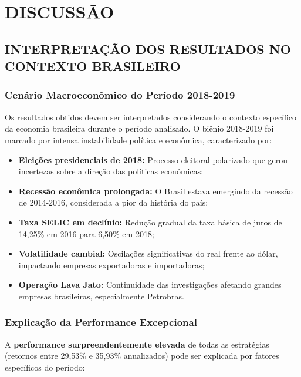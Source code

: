 
\chapter{DISCUSSÃO}

\section{INTERPRETAÇÃO DOS RESULTADOS NO CONTEXTO BRASILEIRO}

\subsection{Cenário Macroeconômico do Período 2018-2019}

Os resultados obtidos devem ser interpretados considerando o contexto específico da economia brasileira durante o período analisado. O biênio 2018-2019 foi marcado por intensa instabilidade política e econômica, caracterizado por:

\begin{itemize}
    \item \textbf{Eleições presidenciais de 2018:} Processo eleitoral polarizado que gerou incertezas sobre a direção das políticas econômicas;
    \item \textbf{Recessão econômica prolongada:} O Brasil estava emergindo da recessão de 2014-2016, considerada a pior da história do país;
    \item \textbf{Taxa SELIC em declínio:} Redução gradual da taxa básica de juros de 14,25\% em 2016 para 6,50\% em 2018;
    \item \textbf{Volatilidade cambial:} Oscilações significativas do real frente ao dólar, impactando empresas exportadoras e importadoras;
    \item \textbf{Operação Lava Jato:} Continuidade das investigações afetando grandes empresas brasileiras, especialmente Petrobras.
\end{itemize}

\subsection{Explicação da Performance Excepcional}

A \textbf{performance surpreendentemente elevada} de todas as estratégias (retornos entre 29,53\% e 35,93\% anualizados) pode ser explicada por fatores específicos do período:

